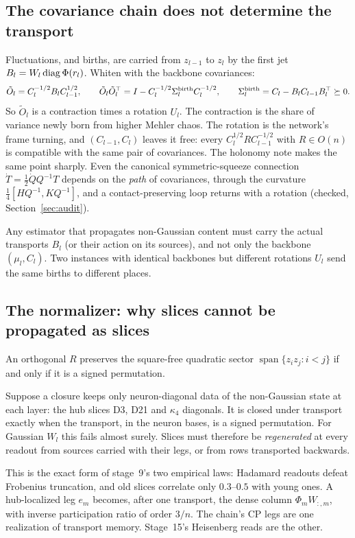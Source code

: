 \label{sec:transport}
\subsection{The covariance chain does not determine the transport}
Fluctuations, and births, are carried from $z_{l-1}$ to $z_l$ by the first jet $B_l=W_l\operatorname{diag}\Phi(r_l)$. Whiten with the backbone covariances:
\[
\tilde O_l=C_l^{-1/2}B_lC_{l-1}^{1/2},\qquad \tilde O_l\tilde O_l^\top=I-C_l^{-1/2}\Sigma^{\rm birth}_lC_l^{-1/2},\qquad \Sigma^{\rm birth}_l=C_l-B_lC_{l-1}B_l^\top\succeq0 .
\]
So $\tilde O_l$ is a contraction times a rotation $U_l$. The contraction is the share of variance newly born from higher Mehler chaos. The
rotation is the network's frame turning, and $(C_{l-1},C_l)$ leaves it free: every $C_l^{1/2}RC_{l-1}^{-1/2}$ with $R\in O(n)$ is compatible with the
same pair of covariances. The holonomy note makes the same point sharply. Even the canonical symmetric-squeeze connection
$\dot T=\frac12\dot QQ^{-1}T$ depends on the \emph{path} of covariances, through the curvature $\frac14[HQ^{-1},KQ^{-1}]$, and a contact-preserving loop
returns with a rotation (checked, Section~\ref{sec:audit}).
\begin{proposition}
Any estimator that propagates non-Gaussian content must carry the actual transports $B_l$ (or their action on its sources), and not
only the backbone $(\mu_l,C_l)$. Two instances with identical backbones but different rotations $U_l$ send the same births to different
places.
\end{proposition}

\subsection{The normalizer: why slices cannot be propagated as slices}
\begin{theorem}
An orthogonal $R$ preserves the square-free quadratic sector $\operatorname{span}\{z_iz_j:i<j\}$ if and only if it is a signed permutation.
\end{theorem}
\begin{corollary}
Suppose a closure keeps only neuron-diagonal data of the non-Gaussian state at each layer: the hub slices D3, D21 and $\kappa_4$
diagonals. It is closed under transport exactly when the transport, in the neuron bases, is a signed permutation. For Gaussian $W_l$ this
fails almost surely. Slices must therefore be \emph{regenerated} at every readout from sources carried with their legs, or from rows
transported backwards.
\end{corollary}
This is the exact form of stage~9's two empirical laws: Hadamard readouts defeat Frobenius truncation, and old slices correlate only
$0.3$--$0.5$ with young ones. A hub-localized leg $e_m$ becomes, after one transport, the dense column $\Phi_mW_{:,m}$, with inverse
participation ratio of order $3/n$. The chain's CP legs are one realization of transport memory. Stage~15's Heisenberg reads are the
other.

